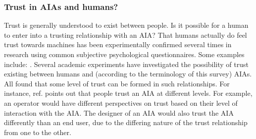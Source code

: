     \subsubsection{Trust in AIAs and humans?}
        Trust is generally understood to exist between people. Is it possible for a human to enter into a trusting relationship with an AIA?
        That humans actually do feel trust towards machines has been experimentally confirmed several times in research using common subjective psychological questionnaires. Some examples include: \citet{Muir1996-gt,Reeves1997-ad,Groom2007-bz,Mcknight2011-gv,Riley1996-qm,Bainbridge2011-pl,Kaniarasu2012-mo,Salem2015-md,Desai2012-rc, Freedy2007-sg, Wang2016-id, Inagaki1998-cl, Kaniarasu2013-ho}. 
 Several academic experiments have investigated the possibility of trust existing between humans and (according to the terminology of this survey) AIAs. All found that some level of trust can be formed in such relationships. For instance, ref. \citet{Lacher2014-yc} points out that people trust an AIA at different levels. For example, an operator would have different perspectives on trust based on their level of interaction with the AIA. The designer of an AIA would also trust the AIA differently than an end user, due to the differing nature of the trust relationship from one to the other. 
